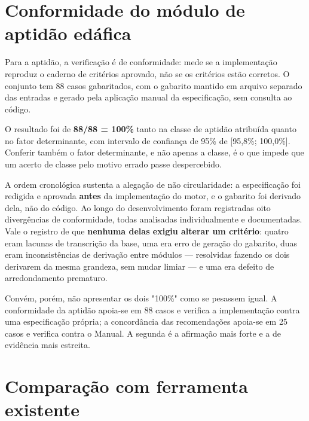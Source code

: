 \section{Conformidade do módulo de aptidão edáfica}

Para a aptidão, a verificação é de conformidade: mede se a implementação reproduz o
caderno de critérios aprovado, não se os critérios estão corretos. O conjunto tem 88
casos gabaritados, com o gabarito mantido em arquivo separado das entradas e gerado pela
aplicação manual da especificação, sem consulta ao código.

O resultado foi de \textbf{88/88 = 100\%} tanto na classe de aptidão atribuída quanto no
fator determinante, com intervalo de confiança de 95\% de [95,8\%; 100,0\%]. Conferir
também o fator determinante, e não apenas a classe, é o que impede que um acerto de
classe pelo motivo errado passe despercebido.

A ordem cronológica sustenta a alegação de não circularidade: a especificação foi
redigida e aprovada \textbf{antes} da implementação do motor, e o gabarito foi derivado
dela, não do código. Ao longo do desenvolvimento foram registradas oito divergências de
conformidade, todas analisadas individualmente e documentadas. Vale o registro de que
\textbf{nenhuma delas exigiu alterar um critério}: quatro eram lacunas de transcrição da
base, uma era erro de geração do gabarito, duas eram inconsistências de derivação entre
módulos --- resolvidas fazendo os dois derivarem da mesma grandeza, sem mudar limiar ---
e uma era defeito de arredondamento prematuro.

Convém, porém, não apresentar os dois "100\%" como se pesassem igual. A conformidade da
aptidão apoia-se em 88 casos e verifica a implementação contra uma especificação própria;
a concordância das recomendações apoia-se em 25 casos e verifica contra o Manual. A
segunda é a afirmação mais forte e a de evidência mais estreita.

\section{Comparação com ferramenta existente}


